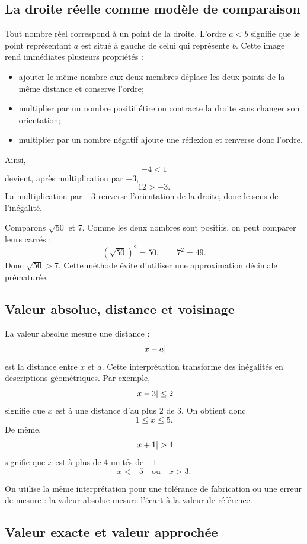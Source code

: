 \subsection{La droite réelle comme modèle de comparaison}

Tout nombre réel correspond à un point de la droite. L'ordre $a<b$ signifie que le point représentant $a$ est situé à gauche de celui qui représente $b$. Cette image rend immédiates plusieurs propriétés :
\begin{itemize}
\item ajouter le même nombre aux deux membres déplace les deux points de la même distance et conserve l'ordre;
\item multiplier par un nombre positif étire ou contracte la droite sans changer son orientation;
\item multiplier par un nombre négatif ajoute une réflexion et renverse donc l'ordre.
\end{itemize}

Ainsi,
\[
-4<1
\]
devient, après multiplication par $-3$,
\[
12>-3.
\]
La multiplication par $-3$ renverse l'orientation de la droite, donc le sens de l'inégalité.

\begin{examplebox}
Comparons $\sqrt{50}$ et $7$. Comme les deux nombres sont positifs, on peut comparer leurs carrés :
\[
(\sqrt{50})^2=50,
\qquad
7^2=49.
\]
Donc $\sqrt{50}>7$. Cette méthode évite d'utiliser une approximation décimale prématurée.
\end{examplebox}

\subsection{Valeur absolue, distance et voisinage}

La valeur absolue mesure une distance :
\[
\left\lvert x-a\right\rvert
\]
est la distance entre $x$ et $a$. Cette interprétation transforme des inégalités en descriptions géométriques. Par exemple,
\[
\left\lvert x-3\right\rvert\leq2
\]
signifie que $x$ est à une distance d'au plus $2$ de $3$. On obtient donc
\[
1\leq x\leq5.
\]
De même,
\[
\left\lvert x+1\right\rvert>4
\]
signifie que $x$ est à plus de $4$ unités de $-1$ :
\[
x<-5\quad\text{ou}\quad x>3.
\]

On utilise la même interprétation pour une tolérance de fabrication ou une erreur de mesure : la valeur absolue mesure l'écart à la valeur de référence.

\subsection{Valeur exacte et valeur approchée}

